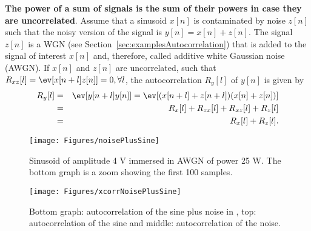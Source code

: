 \bExample \textbf{The power of a sum of signals is the sum of their powers in case they are uncorrelated}.
\label{ex:autocorrelationAWGN}
Assume that a sinusoid $x[n]$ is contaminated by noise $z[n]$ such that the noisy version of the signal is $y[n]=x[n]+z[n]$. 
The signal $z[n]$ is a WGN (see Section~\ref{sec:examplesAutocorrelation}) that is added to the signal of interest $x[n]$ and, therefore, called additive white Gaussian noise (AWGN). 
If $x[n]$ and $z[n]$ are uncorrelated, such that $R_{xz}[l]=\ev[x[n+l] z[n]] = 0, \forall l$, the autocorrelation $R_y[l]$ of $y[n]$ is given by
\begin{eqnarray*}
R_y[l] & = & \ev[y[n+l]y[n]] = \ev[(x[n+l]+z[n+l])(x[n]+z[n])] \\
& = & R_x[l] + R_{zx}[l] + R_{xz}[l] + R_z[l] \\
& = & R_x[l] + R_z[l].
\end{eqnarray*}

\begin{figure}[htbp]
\centering
\texttt{[image: Figures/noisePlusSine]}
\caption{Sinusoid of amplitude 4 V immersed in AWGN of power 25 W. The bottom graph is a zoom showing the first 100 samples.\label{fig:noisePlusSine}}
\end{figure}

\begin{figure}[htbp]
\centering
\texttt{[image: Figures/xcorrNoisePlusSine]}
\caption[Autocorrelations of sine plus noise]{Bottom graph: autocorrelation of the sine plus noise in , top: autocorrelation of the sine and middle: autocorrelation  of the noise.\label{fig:xcorrNoisePlusSine}}
\end{figure}

